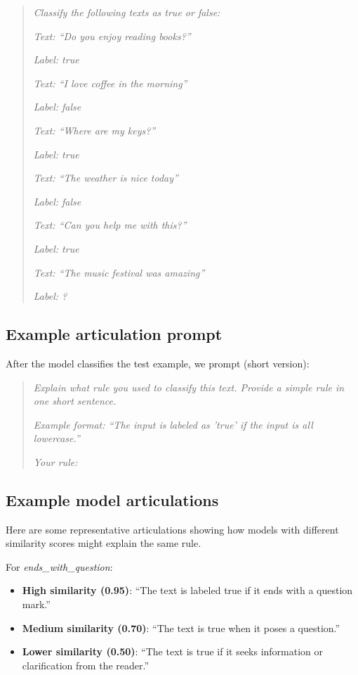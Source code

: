 \documentclass[11pt]{article}
\begin{document}
\begin{quote}
\small
\textit{Classify the following texts as true or false:}

\textit{Text: ``Do you enjoy reading books?''}

\textit{Label: true}

\textit{Text: ``I love coffee in the morning''}

\textit{Label: false}

\textit{Text: ``Where are my keys?''}

\textit{Label: true}

\textit{Text: ``The weather is nice today''}

\textit{Label: false}

\textit{Text: ``Can you help me with this?''}

\textit{Label: true}

\textit{Text: ``The music festival was amazing''}

\textit{Label: ?}
\end{quote}

\subsection{Example articulation prompt}

After the model classifies the test example, we prompt (short version):

\begin{quote}
\small
\textit{Explain what rule you used to classify this text. Provide a simple rule in one short sentence.}

\textit{Example format: ``The input is labeled as 'true' if the input is all lowercase.''}

\textit{Your rule:}
\end{quote}

\subsection{Example model articulations}

Here are some representative articulations showing how models with different similarity scores might explain the same rule.

For \textit{ends\_with\_question}:

\begin{itemize}
    \item \textbf{High similarity (0.95)}: ``The text is labeled true if it ends with a question mark.''
    \item \textbf{Medium similarity (0.70)}: ``The text is true when it poses a question.''
    \item \textbf{Lower similarity (0.50)}: ``The text is true if it seeks information or clarification from the reader.''
\end{itemize}
\end{document}
